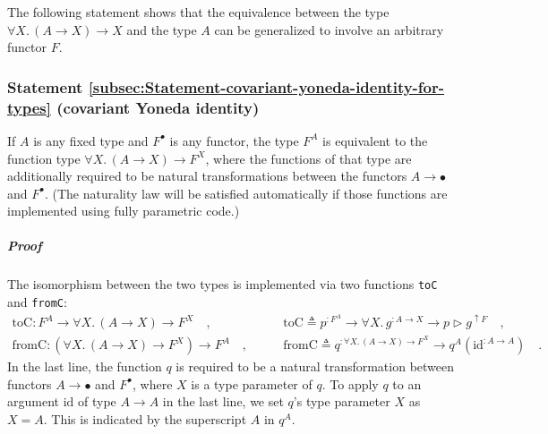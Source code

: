 The following statement shows that the equivalence between the type
$\forall X.\,\left(A\rightarrow X\right)\rightarrow X$ and the type
$A$ can be generalized to involve an arbitrary functor $F$.

\subsubsection{Statement \label{subsec:Statement-covariant-yoneda-identity-for-types}\ref{subsec:Statement-covariant-yoneda-identity-for-types}
(covariant Yoneda identity)}

If $A$ is any fixed type and $F^{\bullet}$ is any functor, the type
$F^{A}$ is equivalent to the function type $\forall X.\,(A\rightarrow X)\rightarrow F^{X}$,
where the functions of that type are additionally required to be natural
transformations between the functors $A\rightarrow\bullet$ and $F^{\bullet}$.
(The naturality law will be satisfied automatically if those functions
are implemented using fully parametric code.)

\subparagraph{Proof}

The isomorphism between the two types is implemented via two functions
\lstinline!toC! and \lstinline!fromC!:
\begin{align*}
\text{toC}:F^{A}\rightarrow\forall X.\,(A\rightarrow X)\rightarrow F^{X}\quad, & \quad\quad\text{toC}\triangleq p^{:F^{A}}\rightarrow\forall X.\,g^{:A\rightarrow X}\rightarrow p\triangleright g^{\uparrow F}\quad,\\
\text{fromC}:(\forall X.\,(A\rightarrow X)\rightarrow F^{X})\rightarrow F^{A}\quad, & \quad\quad\text{fromC}\triangleq q^{:\forall X.\,(A\rightarrow X)\rightarrow F^{X}}\rightarrow q^{A}(\text{id}^{:A\rightarrow A})\quad.
\end{align*}
In the last line, the function $q$ is required to be a natural transformation
between functors $A\rightarrow\bullet$ and $F^{\bullet}$, where
$X$ is a type parameter of $q$. To apply $q$ to an argument $\text{id}$
of type $A\rightarrow A$ in the last line, we set $q$\textsf{'}s type parameter
$X$ as $X=A$. This is indicated by the superscript $A$ in $q^{A}$. 


